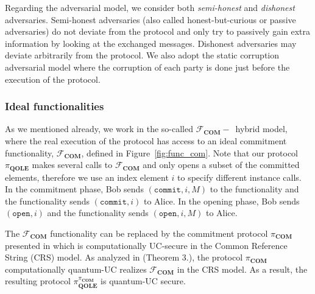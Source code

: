 

 
Regarding the adversarial model, we consider both \textit{semi-honest} and \textit{dishonest} adversaries. Semi-honest adversaries (also called honest-but-curious or passive adversaries) do not deviate from the protocol and only try to passively gain extra information by looking at the exchanged messages. Dishonest adversaries may deviate arbitrarily from the protocol. We also adopt the static corruption adversarial model where the corruption of each party is done just before the execution of the protocol.


\subsubsection{Ideal functionalities}\label{functinalities}

As we mentioned already, we work in the so-called $\mathcal{F}_{\textbf{COM}}-$~hybrid model, where the real execution of the protocol has access to an ideal commitment functionality, $\mathcal{F}_{\textbf{COM}}$, defined in Figure~\ref{fig:func_com}. Note that our protocol $\mathcal{\pi}_{\textbf{QOLE}}$ makes several calls to $\mathcal{F}_{\textbf{COM}}$ and only opens a subset of the committed elements, therefore we use an index element $i$ to specify different instance calls. In the commitment phase, Bob sends $(\texttt{commit}, i, M)$ to the functionality and the functionality sends $(\texttt{commit}, i)$ to Alice. In the opening phase, Bob sends $(\texttt{open}, i)$ and the functionality sends $(\texttt{open}, i, M)$ to Alice.

The $\mathcal{F}_{\textbf{COM}}$ functionality can be replaced by the commitment protocol $\pi_{\textbf{COM}}$ presented in \cite{C01} which is computationally UC-secure in the Common Reference String (CRS) model. As analyzed in \cite{CBGLM21} (Theorem 3.), the protocol $\pi_{\textbf{COM}}$ computationally quantum-UC realizes $\mathcal{F}_{\textbf{COM}}$ in the CRS model. As a result, the resulting protocol $\pi_{\textbf{QOLE}}^{\pi_{\textbf{COM}}}$ is quantum-UC secure.


